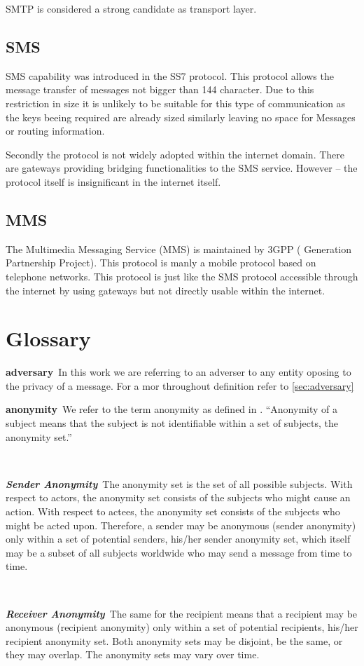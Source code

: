 \documentclass[a4paper,appendixprefix,pdfusetitle,twocolumn,draft,8pt]{scrbook}
\newenvironment{entry}{\par\leavevmode\hangpara{1.5mm}{1}\ignorespaces}{\RaggedRight\par}
\newcommand*{\mainentry}[2]{{\bfseries{#1\label{def:#1}}}~#2\par}
\newcommand*{\subentry}[2]{\par~\begin{minipage}{\columnwidth-0.6cm}{\bfseries{\itshape{#1\label{def:#1}}}}~#2\end{minipage}}
\begin{document}
SMTP is considered a strong candidate as transport layer.  

\section{SMS}
SMS capability was introduced in the SS7 protocol. This protocol allows the message transfer of messages not bigger than 144 character. Due to this restriction in size it is unlikely to be suitable for this type of communication as the keys beeing required are already sized similarly leaving no space for Messages or routing information.

Secondly the protocol is not widely adopted within the internet domain. There are gateways providing bridging functionalities to the SMS service. However -- the protocol itself is insignificant in the internet itself. 

\section{MMS}
The Multimedia Messaging Service (MMS) is maintained by 3GPP ( Generation Partnership Project). This protocol is manly a mobile protocol based on telephone networks. This protocol is just like the SMS protocol accessible through the internet by using gateways but not directly usable within the internet.

\chapter{Glossary}

\begin{entry}
  \mainentry{adversary}{In this work we are referring to an adverser to any entity oposing to the privacy of a message. For a mor throughout definition refer to \ref{sec:adversary}}
\end{entry}

\begin{entry}
	\mainentry{anonymity}{We refer to the term anonymity as defined in \cite{anon_terminology}. ``Anonymity of a subject means that the subject is not identifiable within a set of subjects, the anonymity set.''\omitted}
	\subentry{Sender Anonymity}{The anonymity set is the set of all possible subjects. With respect to actors, the 	anonymity set consists of the subjects who might cause an action. With respect to actees, the anonymity set consists of the subjects who might be acted upon. Therefore, a sender may be anonymous (sender anonymity) only within a set of potential senders, his/her sender anonymity set, which itself may be a subset of all subjects worldwide who may send a message from time to time.}
	\subentry{Receiver Anonymity}{The same for the recipient means that a recipient may be anonymous (recipient anonymity) only within a set of potential recipients, his/her recipient anonymity set. Both anonymity sets may be disjoint, be the same, or they may overlap. The anonymity sets may vary over time.}
\end{entry}
\end{document}
